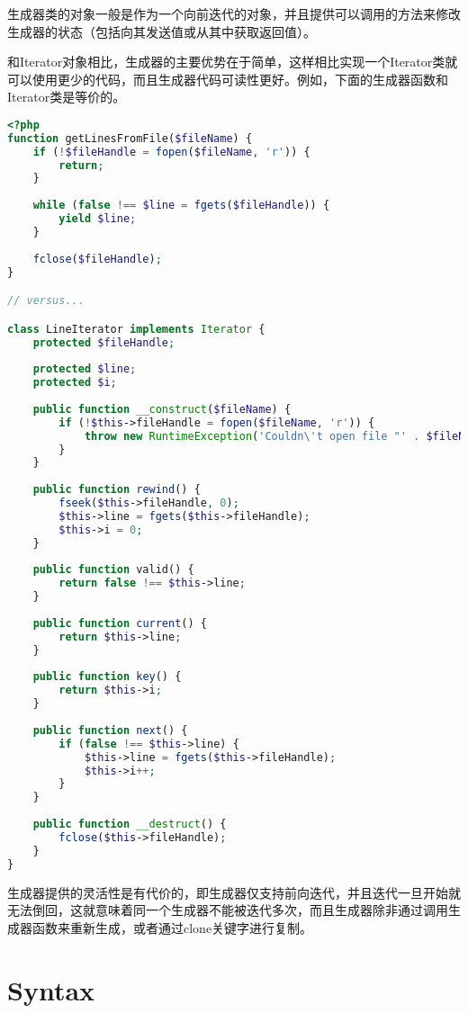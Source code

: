 生成器类的对象一般是作为一个向前迭代的对象，并且提供可以调用的方法来修改生成器的状态（包括向其发送值或从其中获取返回值）。

和Iterator对象相比，生成器的主要优势在于简单，这样相比实现一个Iterator类就可以使用更少的代码，而且生成器代码可读性更好。例如，下面的生成器函数和Iterator类是等价的。

\begin{lstlisting}[language=PHP]
<?php
function getLinesFromFile($fileName) {
    if (!$fileHandle = fopen($fileName, 'r')) {
        return;
    }
 
    while (false !== $line = fgets($fileHandle)) {
        yield $line;
    }
 
    fclose($fileHandle);
}

// versus...

class LineIterator implements Iterator {
    protected $fileHandle;
 
    protected $line;
    protected $i;
 
    public function __construct($fileName) {
        if (!$this->fileHandle = fopen($fileName, 'r')) {
            throw new RuntimeException('Couldn\'t open file "' . $fileName . '"');
        }
    }
 
    public function rewind() {
        fseek($this->fileHandle, 0);
        $this->line = fgets($this->fileHandle);
        $this->i = 0;
    }
 
    public function valid() {
        return false !== $this->line;
    }
 
    public function current() {
        return $this->line;
    }
 
    public function key() {
        return $this->i;
    }
 
    public function next() {
        if (false !== $this->line) {
            $this->line = fgets($this->fileHandle);
            $this->i++;
        }
    }
 
    public function __destruct() {
        fclose($this->fileHandle);
    }
}
\end{lstlisting}

生成器提供的灵活性是有代价的，即生成器仅支持前向迭代，并且迭代一旦开始就无法倒回，这就意味着同一个生成器不能被迭代多次，而且生成器除非通过调用生成器函数来重新生成，或者通过clone关键字进行复制。


\section{Syntax}


